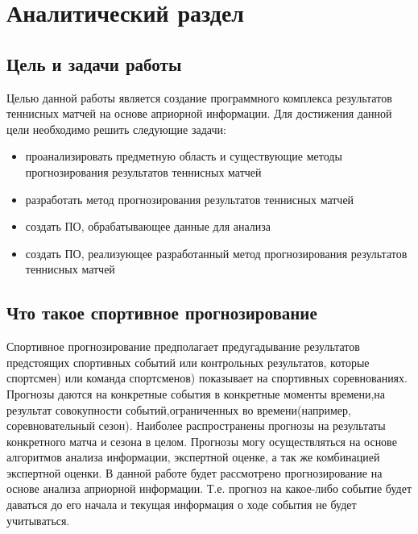 \chapter{Аналитический раздел}
\label{cha:analysis}
\section{Цель и задачи работы}
Целью данной работы является создание программного комплекса результатов теннисных матчей на основе априорной информации.
Для достижения данной цели необходимо решить следующие задачи:
\begin{itemize}
	
\item проанализировать предметную область и существующие методы прогнозирования результатов теннисных матчей
	\item разработать метод прогнозирования результатов теннисных матчей
	\item создать ПО, обрабатывающее данные для анализа
	\item создать ПО, реализующее  разработанный метод прогнозирования результатов теннисных матчей
\end{itemize}
\section{Что такое спортивное прогнозирование}
Спортивное прогнозирование предполагает предугадывание результатов предстоящих спортивных событий или контрольных результатов, которые спортсмен) или команда спортсменов) показывает на спортивных соревнованиях\cite{Book01}. Прогнозы даются на конкретные события в конкретные моменты времени,на результат совокупности событий,ограниченных во времени(например, соревновательный сезон). Наиболее распространены прогнозы на результаты конкретного матча и сезона в целом. Прогнозы могу осуществляться на основе алгоритмов анализа информации, экспертной оценке, а так же комбинацией экспертной оценки. В данной работе будет рассмотрено прогнозирование на основе анализа априорной информации. Т.е. прогноз на какое-либо событие будет даваться до его начала и текущая информация о ходе события не будет учитываться.
